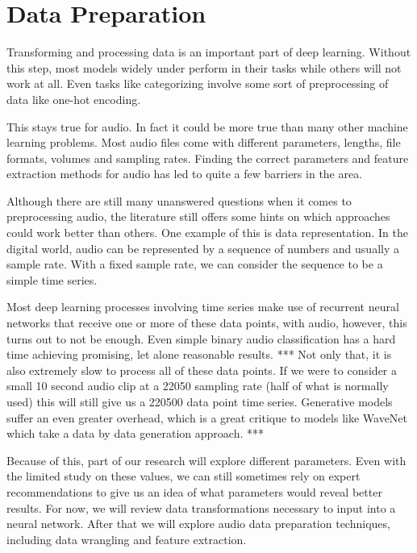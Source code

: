 \documentclass{book}
\begin{document}
\chapter{Data Preparation}
\qquad Transforming and processing data is an important part of deep learning.
Without this step, most models widely under perform in their tasks while others will not work at all.
Even tasks like categorizing involve some sort of preprocessing of data like one-hot encoding.
\par
This stays true for audio.
In fact it could be more true than many other machine learning problems.
Most audio files come with different parameters, lengths, file formats, volumes and sampling rates.
Finding the correct parameters and feature extraction methods for audio has led to quite a few barriers in the area.
\par
Although there are still many unanswered questions when it comes to preprocessing audio, the literature still offers some hints on which approaches could work better than others.
One example of this is data representation.
In the digital world, audio can be represented by a sequence of numbers and usually a sample rate.
With a fixed sample rate, we can consider the sequence to be a simple time series.
\par
Most deep learning processes involving time series make use of recurrent neural networks that receive one or more of these data points, with audio, however, this turns out to not be enough.
Even simple binary audio classification has a hard time achieving promising, let alone reasonable results. *** %
Not only that, it is also extremely slow to process all of these data points.
If we were to consider a small 10 second audio clip at a 22050 sampling rate (half of what is normally used) this will still give us a 220500 data point time series.
Generative models suffer an even greater overhead, which is a great critique to models like WaveNet which take a data by data generation approach. *** %
\par
Because of this, part of our research will explore different parameters.
Even with the limited study on these values, we can still sometimes rely on expert recommendations to give us an idea of what parameters would reveal better results.
For now, we will review data transformations necessary to input into a neural network.
After that we will explore audio data preparation techniques, including data wrangling and feature extraction.
\end{document}
